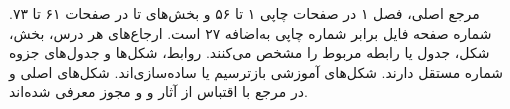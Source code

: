 مرجع اصلی، فصل ۱ در صفحات چاپی ۱ تا ۵۶ و بخش‌های  تا 
در صفحات ۶۱ تا ۷۳. شماره صفحه فایل  برابر شماره چاپی به‌اضافه ۲۷ است.
ارجاع‌های هر درس، بخش، شکل، جدول یا رابطه مربوط را مشخص می‌کنند.
روابط، شکل‌ها و جدول‌های جزوه شماره مستقل دارند.
شکل‌های آموزشی بازترسیم یا ساده‌سازی‌اند.
شکل‌های اصلی  و  در مرجع با اقتباس از آثار
 و  و مجوز  معرفی شده‌اند.
